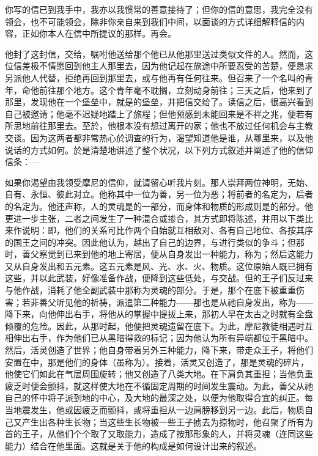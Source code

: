 你写的信已到我手中，我亦以我惯常的善意接待了；但你的信的意思，我完全没有领会，也不可能领会，除非你亲自来到我们中间，以面谈的方式详细解释信的内容，正如你本人在信中所提议的那样。再会。\par

他封了这封信，交给，嘱咐他送给那个他已从他那里送过类似文件的人。然而，这位信差极不情愿回到他主人那里去，因为他记起在旅途中所要忍受的苦楚，便恳求另派他人代替，拒绝再回到那里去，或与他再有任何往来。但召来了一个名叫的青年，命他前往那个地方。这个青年毫不耽搁，立刻动身前往；三天之后，他来到了那里，发现他在一个堡垒中，就是的堡垒，并把信交给了。读信之后，很高兴看到自己被邀请；他毫不迟疑地踏上了旅程；但他预感到未能回来是不祥之兆，便若有所思地前往那里去。至於，他根本没有想过离开的家；他也不放过任何机会与主教交谈。因为这两者都非常热心於调查的行为，渴望知道他是谁，从哪里来，以及他说话的方式如何。於是清楚地讲述了整个状况，以下列方式叙述并阐述了他的信仰信条：—\par

如果你渴望由我领受摩尼的信仰，就请留心听我片刻。那人崇拜两位神明，无始、自有、永恒、彼此对立。他称其中一位为善，另一位为恶；将前者的名定为，后者的名定为。他还声称，人的灵魂是的一部分，而身体和物质的形成则是的部分。他更进一步主张，二者之间发生了一种混合或掺合，其方式即将陈述，并用以下类比来作说明：即，他们的关系可比作两个自始就互相敌对、各有自己地位、各按其序的国王之间的冲突。因此他认为，越出了自己的边界，与进行类似的争斗；但那时，善父察觉到已来到他的地上寄居，便从自身发出一种能力，称为；然后这能力又从自身发出和五元素。这五元素是风、光、水、火、物质。这位原始人既已拥有这些，并以此武装，好像准备作战，便降到这些低处，与交战。但的王子们反过来与他作战，消耗了他全副武装中那称为灵魂的部分。于是，那个在底下被重重伤害；若非善父听见他的祈祷，派遣第二种能力——那也是从祂自身发出，称为——降下来，向他伸出右手，将他从的掌握中提拔上来，那初人早在太古之时就有全盘倾覆的危险。因此，从那时起，他便把灵魂遗留在底下。为此，摩尼教徒相遇时互相伸出右手，作为他们已从黑暗得救的标记；因为他认为所有异端都位于黑暗中。然后，活灵创造了世界；他自身带着另外三种能力，降下来，带走众王子，将他们安置在中，那是他们的身体（虽称为）。接着，活灵又创造了，那是灵魂的碎片，他使它们如此在气层周围旋转；他又创造了八类大地。在下肩负其重担；当他负重疲乏时便会颤抖，就这样使大地在不循固定周期的时间发生震动。为此，善父从祂自己的怀中将子派到地的中心，及大地的最深之处，以便为他取得合宜的纠正。每当地震发生，他或因疲乏而颤抖，或将重担从一边肩膀移到另一边。此后，物质自己又产生出各种生长物；当这些生长物被一些王子掳去为掠物时，他召聚了所有为首的王子，从他们个个取了又取能力，造成了按那形象的人，并将灵魂（连同这些能力）结合在他里面。这就是关于他的构成是如何设计出来的叙述。\par


